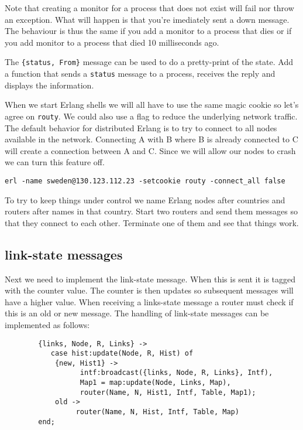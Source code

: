 \documentclass[a4paper, 11pt]{article}
\begin{document}
Note that creating a monitor for a process that does not exist will
fail nor throw an exception. What will happen is that you're
imediately sent a down message. The behaviour is thus the same if you
add a monitor to a process that dies or if you add monitor to a
process that died 10 milliseconds ago.

The {\tt \{status, From\}} message can be used to do a pretty-print of
the state. Add a function that sends a \verb+status+ message to a
process, receives the reply and displays the information.

When we start Erlang shells we will all have to use the same magic
cookie so let's agree on {\tt routy}. We could also use a flag to
reduce the underlying network traffic. The default behavior for
distributed Erlang is to try to connect to all nodes available in the
network. Connecting A with B where B is already connected to C will
create a connection between A and C. Since we will allow our nodes to
 crash we can turn this feature off.

\begin{verbatim}
erl -name sweden@130.123.112.23 -setcookie routy -connect_all false
\end{verbatim}

To try to keep things under control we name Erlang nodes after
countries and routers after names in that country. Start two routers
and send them messages so that they connect to each other. Terminate
one of them and see that things work.

\subsection{link-state messages}

Next we need to implement the link-state message. When this is sent it
is tagged with the counter value. The counter is then updates so
subsequent messages will have a higher value. When receiving a
links-state message a router must check if this is an old or new
message.  The handling of link-state messages can  be implemented as
follows:

\begin{verbatim}
        {links, Node, R, Links} -> 
           case hist:update(Node, R, Hist) of
            {new, Hist1} -> 
                  intf:broadcast({links, Node, R, Links}, Intf), 
                  Map1 = map:update(Node, Links, Map),
                  router(Name, N, Hist1, Intf, Table, Map1); 
            old ->
                 router(Name, N, Hist, Intf, Table, Map) 
        end;
\end{verbatim}
\end{document}

